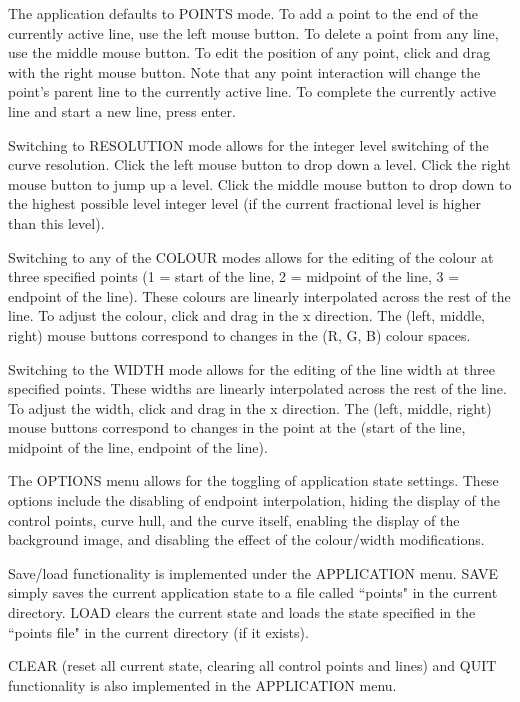 \documentclass[11pt]{article}
\begin{document}
The application defaults to POINTS mode. To add a point to the end of the currently active line, use the left mouse button. To delete a point from any line, use the middle mouse button. To edit the position of any point, click and drag with the right mouse button. Note that any point interaction will change the point's parent line to the currently active line. To complete the currently active line and start a new line, press enter.

Switching to RESOLUTION mode allows for the integer level switching of the curve resolution. Click the left mouse button to drop down a level. Click the right mouse button to jump up a level. Click the middle mouse button to drop down to the highest possible level integer level (if the current fractional level is higher than this level).

Switching to any of the COLOUR modes allows for the editing of the colour at three specified points (1 = start of the line, 2 = midpoint of the line, 3 = endpoint of the line). These colours are linearly interpolated across the rest of the line. To adjust the colour, click and drag in the x direction. The (left, middle, right) mouse buttons correspond to changes in the (R, G, B) colour spaces.

Switching to the WIDTH mode allows for the editing of the line width at three specified points. These widths are linearly interpolated across the rest of the line. To adjust the width, click and drag in the x direction. The (left, middle, right) mouse buttons correspond to changes in the point at the (start of the line, midpoint of the line, endpoint of the line).

The OPTIONS menu allows for the toggling of application state settings. These options include the disabling of endpoint interpolation, hiding the display of the control points, curve hull, and the curve itself, enabling the display of the background image, and disabling the effect of the colour/width modifications.

Save/load functionality is implemented under the APPLICATION menu. SAVE simply saves the current application state to a file called ``points" in the current directory. LOAD clears the current state and loads the state specified in the ``points file" in the current directory (if it exists).

CLEAR (reset all current state, clearing all control points and lines) and QUIT functionality is also implemented in the APPLICATION menu.
\end{document}
